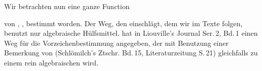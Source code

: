 Wir betrachten nun eine ganze Function


von , ,  bestimmt worden. Der Weg, den
 einschlägt, dem wir im Texte folgen, benutzt nur algebraische
Hülfsmittel.  hat in Liouville's Journal Ser.\,2, Bd.\,1 einen
Weg für die Vorzeichenbestimmung angegeben, der mit Benutzung einer
Bemerkung von  (Schlömilch's Ztschr. Bd.\,15, Literaturzeitung
S.\,21) gleichfalls zu einem rein algebraischen wird.
